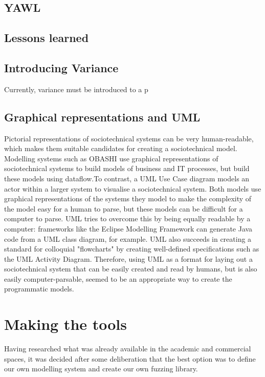\subsection{YAWL} %

\subsection{Lessons learned} %



\subsection{Introducing Variance}
\label{Variance_research}
Currently, variance must be introduced to a p

\subsection{Graphical representations and UML}
\label{pictorial}
Pictorial representations of sociotechnical systems can be very human-readable, which makes them suitable candidates for creating a sociotechnical model. Modelling systems such as OBASHI\cite{ObashiMethodology} use graphical representations of sociotechnical systems to build models of business and IT processes, but build these models using dataflow.To contrast, a UML Use Case diagram\cite{Omg2010} models an actor within a larger system to visualise a sociotechnical system. Both models use graphical representations of the systems they model to make the complexity of the model easy for a human to parse, but these models can be difficult for a computer to parse. UML tries to overcome this by being equally readable by a computer: frameworks like the Eclipse Modelling Framework can generate Java code from a UML class diagram, for example\cite{EMFManual}. UML also succeeds in creating a standard for colloquial "flowcharts" by creating well-defined specifications such as the UML Activity Diagram. Therefore, using UML as a format for laying out a sociotechnical system that can be easily created and read by humans, but is also easily computer-parsable, seemed to be an appropriate way to create the programmatic models.


\section{Making the tools}  
\label{planning_head}
Having researched what was already available in the academic and commercial spaces, it was decided after some deliberation that the best option was to define our own modelling system and create our own fuzzing library. 

